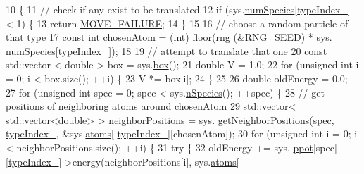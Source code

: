\begin{DoxyCode}
10                                            \{
11                 \textcolor{comment}{// check if any exist to be translated}
12     \textcolor{keywordflow}{if} (sys.\hyperlink{classsim_system_a9eea865e6dc1cff377b1e79c4d9c23f0}{numSpecies}[\hyperlink{classmc_move_acb731965547b0326ef318ec96da8b46a}{typeIndex\_}] < 1) \{
13         \textcolor{keywordflow}{return} \hyperlink{moves_8h_a9832cf5fcfa8c0894545b591c9908e39}{MOVE\_FAILURE};
14     \}
15     
16                 \textcolor{comment}{// choose a random particle of that type}
17                 \textcolor{keyword}{const} \textcolor{keywordtype}{int} chosenAtom = (int) floor(\hyperlink{utilities_8cpp_a0f9542af4b475ac79cb679d7a8d14db0}{rng} (&\hyperlink{global_8h_a3f4e4ea24d5a5c66feae55d1f329c884}{RNG\_SEED}) * sys.
      \hyperlink{classsim_system_a9eea865e6dc1cff377b1e79c4d9c23f0}{numSpecies}[\hyperlink{classmc_move_acb731965547b0326ef318ec96da8b46a}{typeIndex\_}]);
18  
19                 \textcolor{comment}{// attempt to translate that one}
20                 \textcolor{keyword}{const} std::vector < double > box = sys.\hyperlink{classsim_system_a8bff9dfb95b1b09a0fab2c1c485ade07}{box}();
21     \textcolor{keywordtype}{double} V = 1.0;
22     \textcolor{keywordflow}{for} (\textcolor{keywordtype}{unsigned} \textcolor{keywordtype}{int} i = 0; i < box.size(); ++i) \{
23         V *= box[i];
24     \}
25         
26     \textcolor{keywordtype}{double} oldEnergy = 0.0;
27     \textcolor{keywordflow}{for} (\textcolor{keywordtype}{unsigned} \textcolor{keywordtype}{int} spec = 0; spec < sys.\hyperlink{classsim_system_ab5e2e9b6204de15520302fe1d51688dd}{nSpecies}(); ++spec) \{
28         \textcolor{comment}{// get positions of neighboring atoms around chosenAtom}
29         std::vector< std::vector<double> > neighborPositions = sys.
      \hyperlink{classsim_system_a7ac49b2311cd8230df8d078a9d897b35}{getNeighborPositions}(spec, \hyperlink{classmc_move_acb731965547b0326ef318ec96da8b46a}{typeIndex\_}, &sys.\hyperlink{classsim_system_a90421b19082f7fb8fc23b7264b1161e4}{atoms}[
      \hyperlink{classmc_move_acb731965547b0326ef318ec96da8b46a}{typeIndex\_}][chosenAtom]);
30                 \textcolor{keywordflow}{for} (\textcolor{keywordtype}{unsigned} \textcolor{keywordtype}{int} i = 0; i < neighborPositions.size(); ++i) \{
31                                                 \textcolor{keywordflow}{try} \{
32                                                                 oldEnergy += sys.
      \hyperlink{classsim_system_a8d6271751a62f61edcf57f773540a4a3}{ppot}[spec][\hyperlink{classmc_move_acb731965547b0326ef318ec96da8b46a}{typeIndex\_}]->energy(neighborPositions[i], sys.\hyperlink{classsim_system_a90421b19082f7fb8fc23b7264b1161e4}{atoms}[

\end{DoxyCode}
